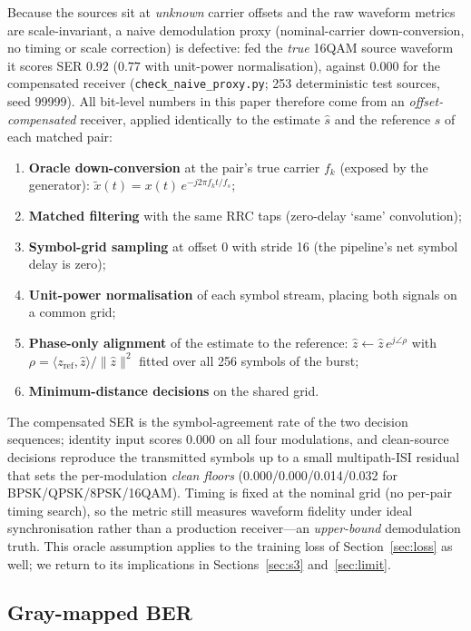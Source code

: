 \documentclass[review,12pt]{elsarticle}
\begin{document}
Because the sources sit at \emph{unknown} carrier offsets and the raw
waveform metrics are scale-invariant, a naive demodulation proxy
(nominal-carrier down-conversion, no timing or scale correction) is
defective: fed the \emph{true} 16QAM source waveform it scores SER
$0.92$ ($0.77$ with unit-power normalisation), against $0.000$ for the
compensated receiver (\texttt{check\_naive\_proxy.py}; 253 deterministic
test sources, seed 99999). All bit-level numbers in this paper therefore come
from an \emph{offset-compensated} receiver, applied identically to the
estimate $\hat{s}$ and the reference $s$ of each matched pair:
\begin{enumerate}
  \item \textbf{Oracle down-conversion} at the pair's true carrier
        $f_k$ (exposed by the generator): $\tilde{x}(t) = x(t)\,
        e^{-j 2 \pi f_k t / f_s}$;
  \item \textbf{Matched filtering} with the same RRC taps
        (zero-delay `same' convolution);
  \item \textbf{Symbol-grid sampling} at offset 0 with stride 16 (the
        pipeline's net symbol delay is zero);
  \item \textbf{Unit-power normalisation} of each symbol stream,
        placing both signals on a common grid;
  \item \textbf{Phase-only alignment} of the estimate to the reference:
        $\hat{z} \leftarrow \hat{z}\, e^{j \angle \rho}$ with
        $\rho = \langle z_{\mathrm{ref}}, \hat{z} \rangle /
        \|\hat{z}\|^2$ fitted over all 256 symbols of the burst;
  \item \textbf{Minimum-distance decisions} on the shared grid.
\end{enumerate}
The compensated SER is the symbol-agreement rate of the two decision
sequences; identity input scores $0.000$ on all four modulations, and
clean-source decisions reproduce the transmitted symbols up to a small
multipath-ISI residual that sets the per-modulation \emph{clean floors}
(0.000/0.000/0.014/0.032 for BPSK/QPSK/8PSK/16QAM). Timing is fixed at
the nominal grid (no per-pair timing search), so the metric still
measures waveform fidelity under ideal synchronisation rather than a
production receiver---an \emph{upper-bound} demodulation truth. This
oracle assumption applies to the training loss of
Section~\ref{sec:loss} as well; we return to its implications in
Sections~\ref{sec:s3} and~\ref{sec:limit}.

\subsection{Gray-mapped BER}
\label{sec:ber}
\end{document}
